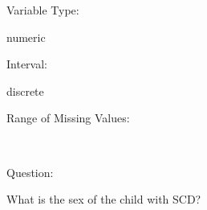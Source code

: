 \documentclass[
]{article}
\begin{document}
\begin{minipage}[t]{0.3\linewidth}

Variable Type:

\end{minipage}%
\begin{minipage}[t]{0.7\linewidth}

numeric

\end{minipage}

\begin{minipage}[t]{0.3\linewidth}

Interval:

\end{minipage}%
\begin{minipage}[t]{0.7\linewidth}

discrete

\end{minipage}

\begin{minipage}[t]{0.3\linewidth}

Range of Missing Values:

\end{minipage}%
\begin{minipage}[t]{0.7\linewidth}

~

\end{minipage}

\begin{minipage}[t]{0.3\linewidth}

Question:

\end{minipage}%
\begin{minipage}[t]{0.7\linewidth}

What is the sex of the child with SCD?

\end{minipage}
\end{document}

